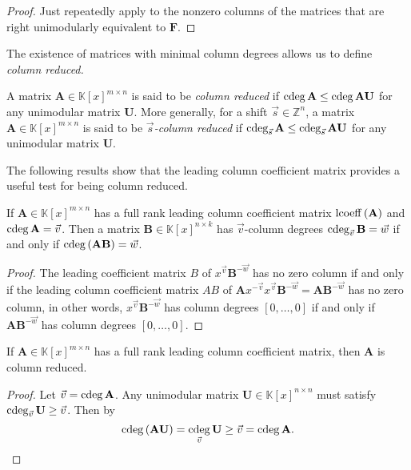 \begin{proof}
Just repeatedly apply  to the
nonzero columns of the matrices that are right unimodularly equivalent
to $\mathbf{F}$. 
\end{proof}
The existence of matrices with minimal column degrees allows us to
define \emph{column reduced.}
\begin{defn}
A matrix $\mathbf{A}\in\mathbb{K}\left[x\right]^{m\times n}$ is said
to be \emph{column reduced} if $\cdeg\mathbf{A}\le\cdeg\mathbf{A}\mathbf{U}$
for any unimodular matrix $\mathbf{U}$. More generally, for a shift
$\vec{s}\in\mathbb{Z}^{n}$, a matrix $\mathbf{A}\in\mathbb{K}\left[x\right]^{m\times n}$
is said to be $\vec{s}$\emph{-column reduced} if $\cdeg_{\vec{s}}\mathbf{A}\le\cdeg_{\vec{s}}\mathbf{A}\mathbf{U}$
for any unimodular matrix $\mathbf{U}$.


\end{defn}
The following results show that the leading column coefficient matrix
provides a useful test for being column reduced.
\begin{lem}
\label{lem:predictableDegree0}If $\mathbf{A}\in\mathbb{K}\left[x\right]^{m\times n}$
has a full rank leading column coefficient matrix $\operatorname{lcoeff}\left(\mathbf{A}\right)$
and $\cdeg\mathbf{A}=\vec{v}$. Then a matrix $\mathbf{B}\in\mathbb{K}\left[x\right]^{n\times k}$
has $\vec{v}$-column degrees $\cdeg_{\vec{v}}\mathbf{B}=\vec{w}$
if and only if $\cdeg\left(\mathbf{A}\mathbf{B}\right)=\vec{w}$. \end{lem}
\begin{proof}
The leading coefficient matrix $B$ of $x^{\vec{v}}\mathbf{B}^{-\vec{w}}$
has no zero column if and only if the leading column coefficient matrix
$AB$ of $\mathbf{A}x^{-\vec{v}}x^{\vec{v}}\mathbf{B}^{-\vec{w}}=\mathbf{A}\mathbf{B}^{-\vec{w}}$
has no zero column, in other words, $x^{\vec{v}}\mathbf{B}^{-\vec{w}}$
has column degrees $\left[0,\dots,0\right]$ if and only if $\mathbf{A}\mathbf{B}^{-\vec{w}}$
has column degrees $\left[0,\dots,0\right]$.\end{proof}
\begin{cor}
\label{cor:fullColumnRankLeadingCoefficientMatrixImpliesColumnReduced}If
$\mathbf{A}\in\mathbb{K}\left[x\right]^{m\times n}$ has a full rank
leading column coefficient matrix, then $\mathbf{A}$ is column reduced. \end{cor}
\begin{proof}
Let $\vec{v}=\cdeg\mathbf{A}$. Any unimodular matrix $\mathbf{U}\in\mathbb{K}\left[x\right]^{n\times n}$
must satisfy $\cdeg_{\vec{v}}\mathbf{U}\ge\vec{v}$. Then by 
\[
\cdeg\left(\mathbf{A}\mathbf{U}\right)=\cdeg_{\vec{v}}\mathbf{U}\ge\vec{v}=\cdeg\mathbf{A}.
\]
\end{proof}
